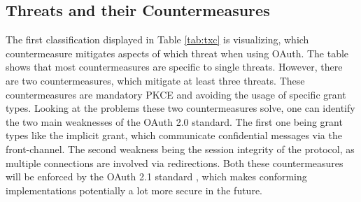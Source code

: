 \subsection{Threats and their Countermeasures}

The first classification displayed in Table \ref{tab:txc} is visualizing, which countermeasure mitigates aspects of which threat when using OAuth. The table shows that most countermeasures are specific to single threats. However, there are two countermeasures, which mitigate at least three threats. These countermeasures are mandatory PKCE and avoiding the usage of specific grant types. Looking at the problems these two countermeasures solve, one can identify the two main weaknesses of the OAuth 2.0 standard. The first one being grant types like the implicit grant, which communicate confidential messages via the front-channel. The second weakness being the session integrity of the protocol, as multiple connections are involved via redirections. Both these countermeasures will be enforced by the OAuth 2.1 standard \cite{hardt2023rfc}, which makes conforming implementations potentially a lot more secure in the future.

